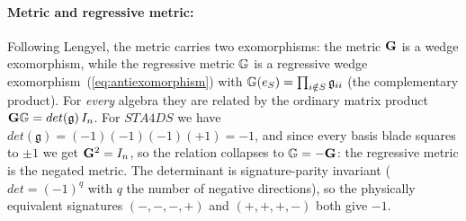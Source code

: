 \paragraph{Metric and regressive metric:} Following Lengyel, the metric carries two
exomorphisms: the metric $\mathbf{G}$ is a wedge
exomorphism, while the regressive metric $\mathbf{\mathbb{G}}$ is a regressive wedge
exomorphism~(\ref{eq:antiexomorphism}) with $\mathbf{\mathbb{G}}(e_S) = \prod_{i \notin S}
\mathfrak{g}_{ii}$ (the complementary product). For \emph{every} algebra they are related
by the ordinary matrix product $\mathbf{G}\mathbf{\mathbb{G}} = det(\mathfrak{g})\,I_n$. For
$STA4DS$ we have $det(\mathfrak{g}) = (-1)(-1)(-1)(+1) = -1$, and since every basis blade
squares to $\pm 1$ we get $\mathbf{G}^2 = I_n$, so the relation collapses to $\mathbf{\mathbb{G}}
= -\mathbf{G}$: the regressive metric is the negated metric. The determinant is
signature-parity invariant ($det = (-1)^q$ with $q$ the number of negative directions), so
the physically equivalent signatures $(-,-,-,+)$ and $(+,+,+,-)$ both give $-1$.

